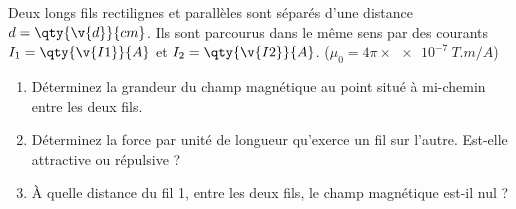 Deux longs fils rectilignes et parallèles sont séparés d'une distance $d = \qty{\v{d}}{cm}$. Ils sont parcourus dans le même sens par des courants $I_1 = \qty{\v{I1}}{A}$ et $I_2 = \qty{\v{I2}}{A}$. ($\mu_0 = 4\pi \times \qty{e-7}{T.m/A}$)

\begin{enumerate}[label=\alph*)]
    \item Déterminez la grandeur du champ magnétique au point situé à mi-chemin entre les deux fils.
    \item Déterminez la force par unité de longueur qu'exerce un fil sur l'autre. Est-elle attractive ou répulsive ?
    \item À quelle distance du fil 1, entre les deux fils, le champ magnétique est-il nul ?
\end{enumerate}

